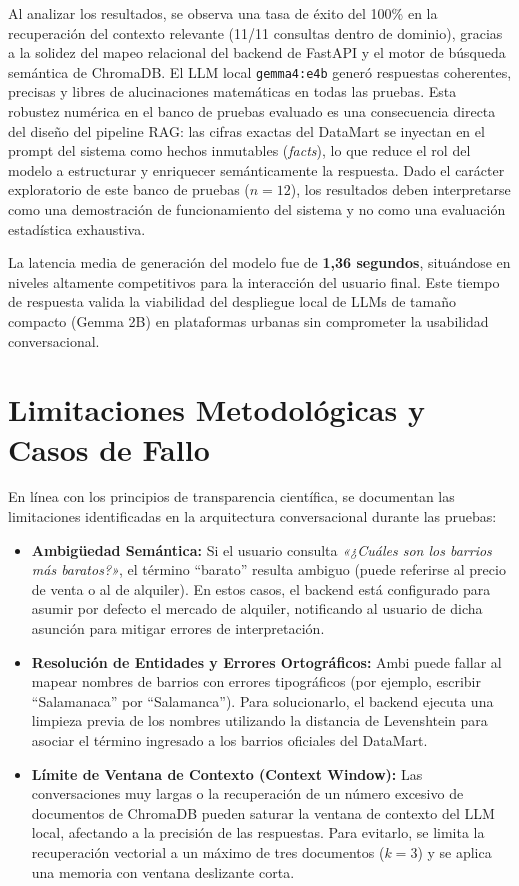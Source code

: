 \documentclass[a4paper,11pt,openany]{book}
\begin{document}
Al analizar los resultados, se observa una tasa de éxito del 100\% en la recuperación del contexto relevante (11/11 consultas dentro de dominio), gracias a la solidez del mapeo relacional del backend de FastAPI y el motor de búsqueda semántica de ChromaDB. El LLM local \texttt{gemma4:e4b} generó respuestas coherentes, precisas y libres de alucinaciones matemáticas en todas las pruebas. Esta robustez numérica en el banco de pruebas evaluado es una consecuencia directa del diseño del pipeline RAG: las cifras exactas del DataMart se inyectan en el prompt del sistema como hechos inmutables (\textit{facts}), lo que reduce el rol del modelo a estructurar y enriquecer semánticamente la respuesta. Dado el carácter exploratorio de este banco de pruebas ($n=12$), los resultados deben interpretarse como una demostración de funcionamiento del sistema y no como una evaluación estadística exhaustiva. 

La latencia media de generación del modelo fue de \textbf{1,36 segundos}, situándose en niveles altamente competitivos para la interacción del usuario final. Este tiempo de respuesta valida la viabilidad del despliegue local de LLMs de tamaño compacto (Gemma 2B) en plataformas urbanas sin comprometer la usabilidad conversacional.

\section{Limitaciones Metodológicas y Casos de Fallo}
En línea con los principios de transparencia científica, se documentan las limitaciones identificadas en la arquitectura conversacional durante las pruebas:
\begin{itemize}
    \item \textbf{Ambigüedad Semántica:} Si el usuario consulta \textit{«¿Cuáles son los barrios más baratos?»}, el término ``barato'' resulta ambiguo (puede referirse al precio de venta o al de alquiler). En estos casos, el backend está configurado para asumir por defecto el mercado de alquiler, notificando al usuario de dicha asunción para mitigar errores de interpretación.
    \item \textbf{Resolución de Entidades y Errores Ortográficos:} Ambi puede fallar al mapear nombres de barrios con errores tipográficos (por ejemplo, escribir ``Salamanaca'' por ``Salamanca''). Para solucionarlo, el backend ejecuta una limpieza previa de los nombres utilizando la distancia de Levenshtein para asociar el término ingresado a los barrios oficiales del DataMart.
    \item \textbf{Límite de Ventana de Contexto (Context Window):} Las conversaciones muy largas o la recuperación de un número excesivo de documentos de ChromaDB pueden saturar la ventana de contexto del LLM local, afectando a la precisión de las respuestas. Para evitarlo, se limita la recuperación vectorial a un máximo de tres documentos ($k=3$) y se aplica una memoria con ventana deslizante corta.
\end{itemize}
\end{document}
